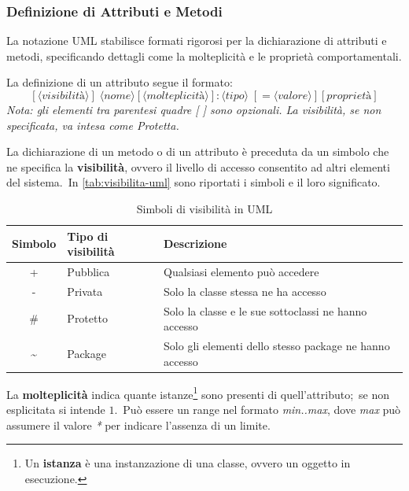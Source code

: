 \subsubsection{Definizione di Attributi e Metodi}

La notazione UML stabilisce formati rigorosi per la dichiarazione di attributi e metodi, specificando dettagli come la molteplicità e le proprietà comportamentali.

La definizione di un attributo segue il formato:
\[
    [\langle \textit{visibilità} \rangle] \;
    \langle \textit{nome} \rangle [\langle \textit{molteplicità} \rangle]: \langle \textit{tipo} \rangle \;
    [= \langle \textit{valore} \rangle][{\textit{proprietà}}]
\]
\textit{Nota: gli elementi tra parentesi quadre [ ] sono opzionali. La visibilità, se non specificata, va intesa come Protetta.}

La dichiarazione di un metodo o di un attributo è preceduta da un simbolo che ne specifica la \textbf{visibilità}, ovvero il livello di accesso consentito ad altri elementi del sistema.\
In \autoref{tab:visibilita-uml} sono riportati i simboli e il loro significato.

\begin{table}[h!]
    \centering
    \caption{Simboli di visibilità in UML}
    \label{tab:visibilita-uml}
    \begin{tabular}{c l p{8cm}}
        \toprule
        \textbf{Simbolo} & \textbf{Tipo di visibilità} & \textbf{Descrizione}                                    \\
        \midrule
        +                & Pubblica                    & Qualsiasi elemento può accedere                         \\
        -                & Privata                     & Solo la classe stessa ne ha accesso                     \\
        \#               & Protetto                    & Solo la classe e le sue sottoclassi ne hanno accesso    \\
        \textasciitilde  & Package                     & Solo gli elementi dello stesso package ne hanno accesso \\
        \bottomrule
    \end{tabular}
\end{table}

La \textbf{molteplicità} indica quante istanze\footnote{Un \textbf{istanza} è una instanzazione di una classe, ovvero un oggetto in esecuzione.} sono presenti di quell'attributo;\
se non esplicitata si intende $1$.\
Può essere un range nel formato \textit{min..max}, dove \textit{max} può assumere il valore \textit{*} per indicare l'assenza di un limite.

